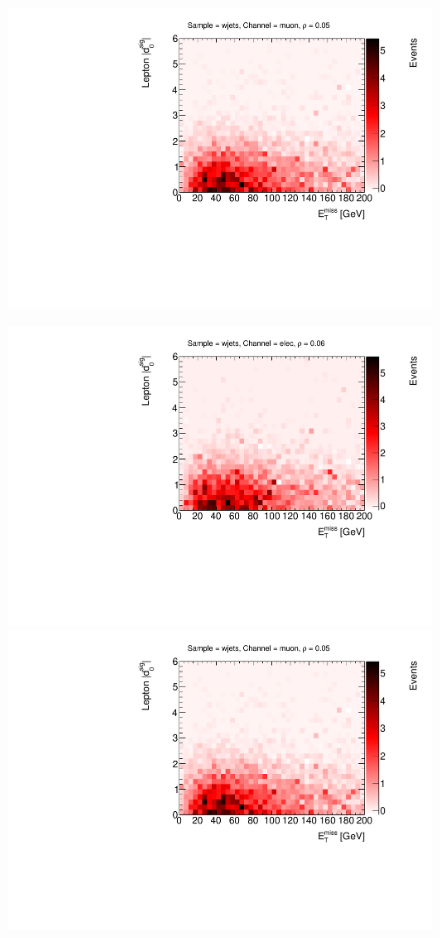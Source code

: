 \begin{figure}[!htbp]
\begin{center}
\includegraphics[scale=0.33]{./figures/boosted/ABCD/h2_d0_met_muon_wjets}\\
\par\medskip
\includegraphics[scale=0.33]{./figures/boosted/ABCD/h2_d0_met_elec_wjets}
\includegraphics[scale=0.33]{./figures/boosted/ABCD/h2_d0_met_muon_wjets}\\

\end{center}
\end{figure}
